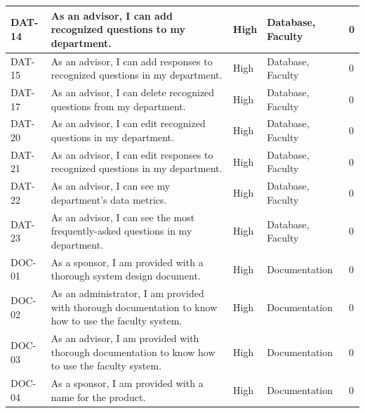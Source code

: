 \documentclass[titlepage, 12pt]{article}
\begin{document}
\begin{center}
\begin{longtable}{ L{1.5cm} L{4cm} L{1.5cm} L{3cm} L{1.5cm} }
        \midrule
        DAT-14 & As an advisor, I can add recognized questions to my department.                                                                   & High   & Database, Faculty    & 0             \\
        \midrule
        DAT-15 & As an advisor, I can add responses to recognized questions in my department.                                                      & High   & Database, Faculty    & 0          \\
        \midrule
        DAT-17 & As an advisor, I can delete recognized questions from my department.                                                              & High   & Database, Faculty    & 0         \\
        \midrule
        DAT-20 & As an advisor, I can edit recognized questions in my department.                                                                  & High   & Database, Faculty    & 0         \\
        \midrule
        DAT-21 & As an advisor, I can edit responses to recognized questions in my department.                                                     & High   & Database, Faculty    & 0         \\
        \midrule
        DAT-22 & As an advisor, I can see my department's data metrics.                                                                            & High   & Database, Faculty    & 0         \\
        \midrule
        DAT-23 & As an advisor, I can see the most frequently-asked questions in my department.                                                    & High   & Database, Faculty    & 0          \\
        \midrule
        DOC-01 & As a sponsor, I am provided with a thorough system design document.                                                               & High   & Documentation       & 0 \\
        \midrule
        DOC-02 & As an administrator, I am provided with thorough documentation to know how to use the faculty system.                             & High   & Documentation       & 0\\
        \midrule
        DOC-03 & As an advisor, I am provided with thorough documentation to know how to use the faculty system.                                   & High   & Documentation       & 0   \\
        \midrule
        DOC-04 & As a sponsor, I am provided with a name for the product.                                                                          & High   & Documentation       & 0  \\

\end{longtable}
\end{center}
\end{document}
